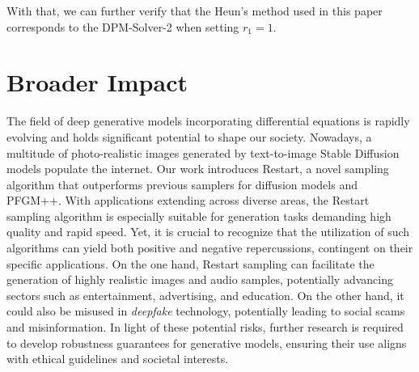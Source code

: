 With that, we can further verify that the Heun's method used in this paper corresponds to the DPM-Solver-2 when setting $r_1=1$.

\section{Broader Impact}

The field of deep generative models incorporating differential equations is rapidly evolving and holds significant potential to shape our society. Nowadays, a multitude of photo-realistic images generated by text-to-image Stable Diffusion models populate the internet. Our work introduces Restart, a novel sampling algorithm that outperforms previous samplers for diffusion models and PFGM++. With applications extending across diverse areas, the Restart sampling algorithm is especially suitable for generation tasks demanding high quality and rapid speed. Yet, it is crucial to recognize that the utilization of such algorithms can yield both positive and negative repercussions, contingent on their specific applications. On the one hand, Restart sampling can facilitate the generation of highly realistic images and audio samples, potentially advancing sectors such as entertainment, advertising, and education. On the other hand, it could also be misused in \textit{deepfake} technology, potentially leading to social scams and misinformation. In light of these potential risks, further research is required to develop robustness guarantees for generative models, ensuring their use aligns with ethical guidelines and societal interests. 
